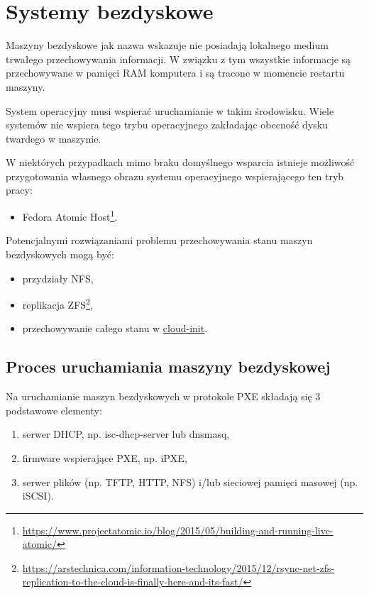 \documentclass[a4paper,12pt,twoside,openany]{report}
\providecommand{\tightlist}{%
  \setlength{\itemsep}{0pt}\setlength{\parskip}{0pt}}
\DeclareRobustCommand{\href}[2]{#2\footnote{\url{#1}}}
\begin{document}
\hypertarget{systemy-bezdyskowe}{%
\chapter{Systemy bezdyskowe}\label{systemy-bezdyskowe}}

Maszyny bezdyskowe jak nazwa wskazuje nie posiadają lokalnego medium
trwałego przechowywania informacji. W związku z tym wszystkie informacje
są przechowywane w pamięci RAM komputera i są tracone w momencie
restartu maszyny.

System operacyjny musi wspierać uruchamianie w takim środowisku. Wiele
systemów nie wspiera tego trybu operacyjnego zakładając obecność dysku
twardego w maszynie.

W niektórych przypadkach mimo braku domyślnego wsparcia istnieje
możliwość przygotowania własnego obrazu systemu operacyjnego
wspierającego ten tryb pracy:

\begin{itemize}
\tightlist
\item
  \href{https://www.projectatomic.io/blog/2015/05/building-and-running-live-atomic/}{Fedora
  Atomic Host}.
\end{itemize}

Potencjalnymi rozwiązaniami problemu przechowywania stanu maszyn
bezdyskowych mogą być:

\begin{itemize}
\tightlist
\item
  przydziały NFS,
\item
  \href{https://arstechnica.com/information-technology/2015/12/rsync-net-zfs-replication-to-the-cloud-is-finally-here-and-its-fast/}{replikacja
  ZFS},
\item
  przechowywanie całego stanu w
  \protect\hyperlink{cloud-init-config}{cloud-init}.
\end{itemize}

\hypertarget{proces-uruchamiania-maszyny-bezdyskowej}{%
\section{Proces uruchamiania maszyny
bezdyskowej}\label{proces-uruchamiania-maszyny-bezdyskowej}}

Na uruchamianie maszyn bezdyskowych w protokole PXE składają się 3
podstawowe elementy:

\begin{enumerate}
\def\labelenumi{\arabic{enumi}.}
\tightlist
\item
  serwer DHCP, np. isc-dhcp-server lub dnsmasq,
\item
  firmware wspierające PXE, np. iPXE,
\item
  serwer plików (np. TFTP, HTTP, NFS) i/lub sieciowej pamięci masowej
  (np. iSCSI).
\end{enumerate}
\end{document}
